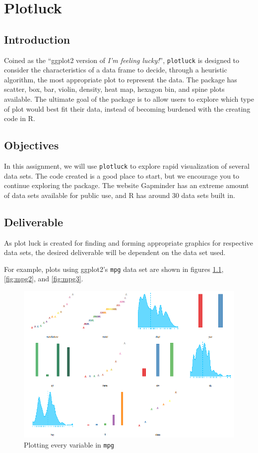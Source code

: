 \chapter{Plotluck}

\section{Introduction}

Coined as the ``ggplot2 version of \emph{I'm feeling lucky!}'', \texttt{plotluck} is designed to consider the characteristics of a data frame to decide, through a heuristic algorithm, the most appropriate plot to represent the data.
The package has scatter, box, bar, violin, density, heat map, hexagon bin, and spine plots available.
The ultimate goal of the package is to allow users to explore which type of plot would best fit their data, instead of becoming burdened with the creating code in R.

\section{Objectives}
In this assignment, we will use \texttt{plotluck} to explore rapid visualization of several data sets.
The code created is a good place to start, but we encourage you to continue exploring the package.
The website Gapminder has an extreme amount of data sets available for public use, and R has around 30 data sets built in.

\section{Deliverable}
As plot luck is created for finding and forming appropriate graphics for respective data sets, the desired deliverable will be dependent on the data set used.

For example, plots using ggplot2's \texttt{mpg} data set are shown in figures \ref{fig:mpg1}, \ref{fig:mpg2}, and \ref{fig:mpg3}.

\begin{figure}[htbp!]
    \centering
    \includegraphics[width=.5\textwidth]{pictures/plotluck/mpgall}
    \caption{Plotting every variable in \texttt{mpg}}
    \label{fig:mpg1}
\end{figure}

